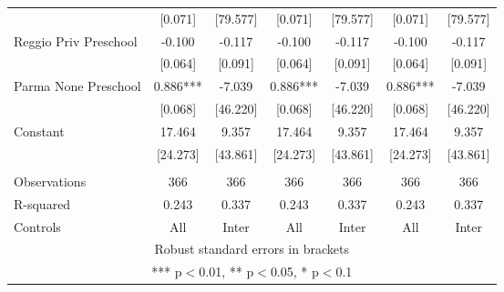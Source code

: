 \begin{tabular}{lcccccc}
 & [0.071] & [79.577] & [0.071] & [79.577] & [0.071] & [79.577] \\
Reggio Priv Preschool & -0.100 & -0.117 & -0.100 & -0.117 & -0.100 & -0.117 \\
 & [0.064] & [0.091] & [0.064] & [0.091] & [0.064] & [0.091] \\
Parma None Preschool & 0.886*** & -7.039 & 0.886*** & -7.039 & 0.886*** & -7.039 \\
 & [0.068] & [46.220] & [0.068] & [46.220] & [0.068] & [46.220] \\
Constant & 17.464 & 9.357 & 17.464 & 9.357 & 17.464 & 9.357 \\
 & [24.273] & [43.861] & [24.273] & [43.861] & [24.273] & [43.861] \\
 &  &  &  &  &  &  \\
Observations & 366 & 366 & 366 & 366 & 366 & 366 \\
R-squared & 0.243 & 0.337 & 0.243 & 0.337 & 0.243 & 0.337 \\
 Controls & All & Inter & All & Inter & All & Inter \\ \hline
\multicolumn{7}{c}{ Robust standard errors in brackets} \\
\multicolumn{7}{c}{ *** p$<$0.01, ** p$<$0.05, * p$<$0.1} \\
\end{tabular}
